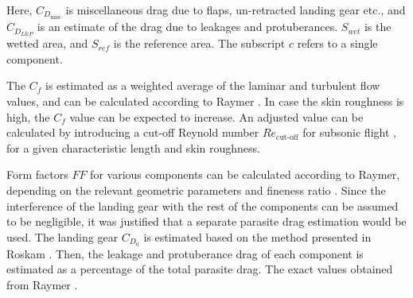 Here, $C_{D_\text{misc}}$ is miscellaneous drag due to flaps, un-retracted landing gear etc., and $C_{D_{L\&P}}$ is an estimate of the drag due to leakages and protuberances. $S_{wet}$ is the wetted area, and $S_{ref}$ is the reference area. The subscript $c$ refers to a single component.

The $C_f$ is estimated as a weighted average of the laminar and turbulent flow values, and can be calculated according to Raymer  \cite[p. 282]{raymer1992aircraft}. In case the skin roughness is high, the $C_f$ value can be expected to increase. An adjusted value can be calculated by introducing a cut-off Reynold number $Re_\text{cut-off}$ for subsonic flight \cite[p. 282]{raymer1992aircraft}, for a given  characteristic length and skin roughness.

Form factors $FF$ for various components can be calculated according to Raymer, depending on the relevant geometric parameters and fineness ratio \cite[p. 283]{raymer1992aircraft}. Since the interference of the landing gear with the rest of the components can be assumed to be negligible, it was justified that a separate parasite drag estimation would be used. The landing gear $C_{D_0}$ is estimated based on the method presented in Roskam \cite{roskamVI}. Then, the leakage and protuberance drag of each component is estimated as a percentage of the total parasite drag. The exact values obtained from Raymer \cite{raymer1992aircraft}.

